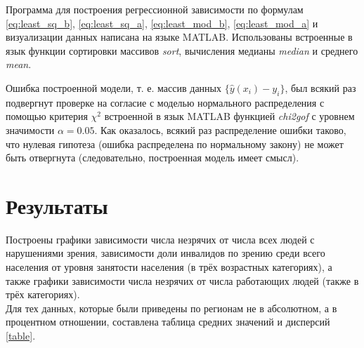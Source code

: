 \documentclass[main.tex]{subfiles}
\begin{document}
Программа для построения регрессионной зависимости по формулам \eqref{eq:least_sq_b}, \eqref{eq:least_sq_a}, \eqref{eq:least_mod_b}, \eqref{eq:least_mod_a} и визуализации данных написана на языке MATLAB. Использованы встроенные в язык функции сортировки массивов \textit{sort}, вычисления медианы \textit{median} и среднего \textit{mean}.  

Ошибка построенной модели, т. е. массив данных $\{\hat y(x_i) - y_i\}$, был всякий раз подвергнут проверке на согласие с моделью нормального распределения с помощью критерия $\chi^2$ встроенной в язык MATLAB функцией \textit{chi2gof} с уровнем значимости $\alpha=0.05$. Как оказалось, всякий раз распределение ошибки таково, что нулевая гипотеза (ошибка распределена по нормальному закону) не может быть отвергнута (следовательно, построенная модель имеет смысл).\\

\newpage
\section{Результаты}
Построены графики зависимости числа незрячих от числа всех людей с нарушениями зрения, зависимости доли инвалидов по зрению среди всего населения от уровня занятости населения (в трёх возрастных категориях), а также графики зависимости числа незрячих от числа работающих людей (также в трёх категориях).\\
Для тех данных, которые были приведены по регионам не в абсолютном, а в процентном отношении, составлена таблица средних значений и дисперсий \ref{table}.  


\end{document}
